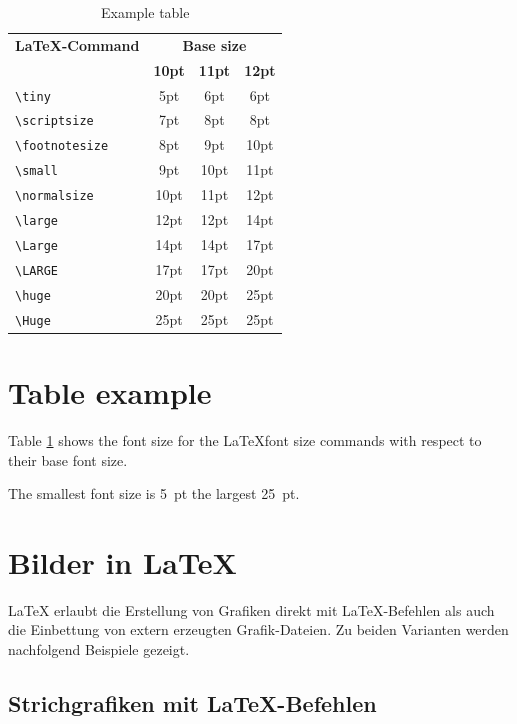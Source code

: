 \documentclass[11pt, a4paper]{article}
\newcommand{\ltx}{\LaTeX}
\begin{document}
\begin{table}[t]
\caption{Example table  \label{tab:Schriftgroessen}}
\centering
\begin{tabular}{lccc}
\toprule
\textbf{\ltx-Command} & \multicolumn{3}{c}{\textbf{Base size}}\\
\cline{2-4} & \textbf{10pt} & \textbf{11pt} & \textbf{12pt}\\
\midrule
\midrule
\verb+\tiny+			& 5pt & 6pt 	& 6pt\\
\verb+\scriptsize+		& 7pt & 8pt		& 8pt\\
\verb+\footnotesize+	& 8pt & 9pt		& 10pt\\
\verb+\small+			& 9pt & 10pt	& 11pt\\
\midrule
\midrule
\verb+\normalsize+		& 10pt	& 11pt	& 12pt\\
\midrule
\midrule
\verb+\large+			& 12pt	& 12pt	& 14pt\\
\verb+\Large+			& 14pt	& 14pt	& 17pt\\
\verb+\LARGE+			& 17pt	& 17pt	& 20pt\\
\verb+\huge+			& 20pt	& 20pt	& 25pt\\
\verb+\Huge+			& 25pt	& 25pt	& 25pt\\
\bottomrule
\end{tabular}
\end{table}%

\section{Table example}
Table \ref{tab:Schriftgroessen} shows the font size for the \ltx font size commands with respect to their base font size.

The smallest font size is 5~pt the largest 25~pt.

\section{Bilder in \ltx}
\ltx{} erlaubt die Erstellung von Grafiken direkt mit \ltx-Befehlen als auch die Einbettung von extern erzeugten Grafik-Dateien. Zu beiden Varianten werden nachfolgend Beispiele gezeigt.




\subsection{Strichgrafiken mit \ltx-Befehlen}
\end{document}
